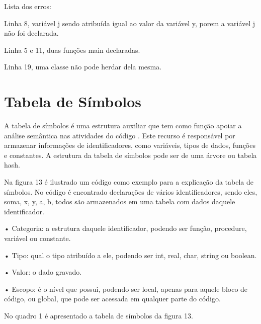 \documentclass[12pt,oneside,a4paper,chapter=TITLE,section=TITLE,sumario=tradicional]{abntex2}
\begin{document}
\begin{figure}[H]
\end{figure}

Lista dos erros:

\begin{lista}
	\item Linha 8, variável j sendo atribuída igual ao valor da variável y, porem a variável j não foi declarada.
	\item Linha 5 e 11, duas funções main declaradas.
	\item Linha 19, uma classe não pode herdar dela mesma.
\end{lista}

\section{Tabela de Símbolos}
\label{sec:tabela-semantica}

A tabela de símbolos é uma estrutura auxiliar que tem como função apoiar a análise semântica nas atividades do código \cite{ricarte2008}. Este recurso é responsável por armazenar informações de identificadores, como variáveis, tipos de dados, funções e constantes. A estrutura da tabela de símbolos pode ser de uma árvore ou tabela hash.

Na figura 13 é ilustrado um código como exemplo para a explicação da tabela de símbolos. No código é encontrado declarações de vários identificadores, sendo eles, soma, x, y, a, b, todos são armazenados em uma tabela com dados daquele identificador.

\begin{figure}[htb]
\end{figure}

•	Categoria: a estrutura daquele identificador, podendo ser função, procedure, variável ou constante.

•	Tipo: qual o tipo atribuído a ele, podendo ser int, real, char, string ou boolean.

•	Valor: o dado gravado.

•	Escopo: é o nível que possui, podendo ser local, apenas para aquele bloco de código, ou global, que pode ser acessada em qualquer parte do código.

No quadro 1 é apresentado a tabela de símbolos da figura 13.
\end{document}
